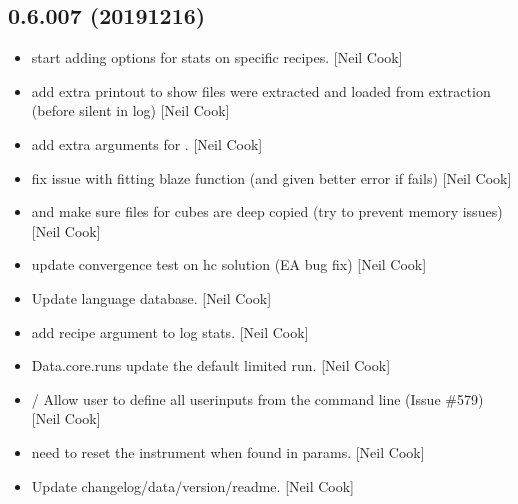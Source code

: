 \documentclass[a4paper,10pt,english]{report}
\begin{document}
\subsection{0.6.007 (2019\sphinxhyphen{}12\sphinxhyphen{}16)}
\label{\detokenize{misc/changelog:id30}}\begin{itemize}
\item {} 
 \sphinxhyphen{} start adding options for stats on
specific recipes. {[}Neil Cook{]}

\item {} 
 \sphinxhyphen{} add extra printout to show files were
extracted and loaded from extraction (before silent in log) {[}Neil
Cook{]}

\item {} 
 \sphinxhyphen{} add extra arguments for
. {[}Neil Cook{]}

\item {} 
 \sphinxhyphen{} fix issue with fitting blaze function
(and given better error if  fails) {[}Neil Cook{]}

\item {} 
 and  \sphinxhyphen{} make sure files for
cubes are deep copied (try to prevent memory issues) {[}Neil Cook{]}

\item {} 
 \sphinxhyphen{} update convergence test on hc solution (EA bug
fix) {[}Neil Cook{]}

\item {} 
Update language database. {[}Neil Cook{]}

\item {} 
 \sphinxhyphen{} add recipe argument
to log stats. {[}Neil Cook{]}

\item {} 
Data.core.runs \sphinxhyphen{}  \sphinxhyphen{} update the default limited run.
{[}Neil Cook{]}

\item {} 
 /  \sphinxhyphen{} Allow user to define all userinputs
from the command line (Issue \#579) {[}Neil Cook{]}

\item {} 
 \sphinxhyphen{} need to re\sphinxhyphen{}set the instrument when found in params.
{[}Neil Cook{]}

\item {} 
Update changelog/data/version/readme. {[}Neil Cook{]}

\end{itemize}
\end{document}
